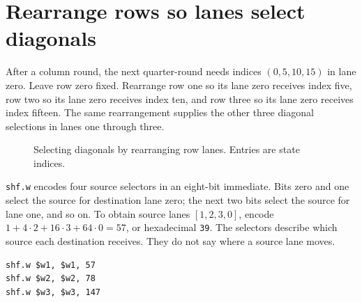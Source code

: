 \section{Rearrange rows so lanes select diagonals}
After a column round, the next quarter-round needs indices \((0,5,10,15)\) in lane
zero. Leave row zero fixed. Rearrange row one so its lane zero receives index five,
row two so its lane zero receives index ten, and row three so its lane zero receives
index fifteen. The same rearrangement supplies the other three diagonal selections
in lanes one through three.

\begin{figure}[htbp]\centering
{}
\caption{Selecting diagonals by rearranging row lanes. Entries are state indices.}
\end{figure}

\texttt{shf.w} encodes four source selectors in an eight-bit immediate. Bits zero
and one select the source for destination lane zero; the next two bits select the
source for lane one, and so on. To obtain source lanes \([1,2,3,0]\), encode
\(1+4\cdot2+16\cdot3+64\cdot0=57\), or hexadecimal \texttt{39}.
The selectors describe which source each destination receives. They do not say
where a source lane moves.
\begin{verbatim}
shf.w $w1, $w1, 57
shf.w $w2, $w2, 78
shf.w $w3, $w3, 147
\end{verbatim}

